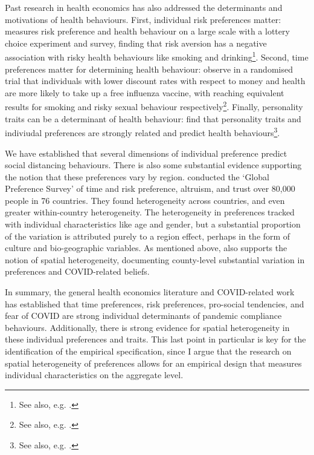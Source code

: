 \documentclass{article}
\begin{document}
Past research in health economics has also addressed the determinants and motivations of health behaviours. First, individual risk preferences matter: \textcite{andersonPredictingHealthBehaviors2008} measures risk preference and health behaviour on a large scale with a lottery choice experiment and survey, finding that risk aversion has a negative association with risky health behaviours like smoking and drinking\footnote{See also, e.g. \textcite{dohmenIndividualRiskAttitudes2011}.}. Second, time preferences matter for determining health behaviour: \textcite{chapmanTimePreferencesPreventive1999} observe in a randomised trial that individuals with lower discount rates with respect to money and health are more likely to take up a free influenza vaccine, with \textcite{harrisonIndividualDiscountRates2010,chessonDiscountRatesRisky2006} reaching equivalent results for smoking and risky sexual behaviour respectively\footnote{See also, e.g.  \textcite{dellavignaPayingNotGo2006,sutterImpatienceUncertaintyExperimental2013,stutzerLimitedSelfcontrolObesity2016,schilbachAlcoholSelfControlField2019}.}. Finally, personality traits can be a determinant of health behaviour: \textcite{rustichiniIntegrationPersonalityTheory2016} find that personality traits and indiviudal preferences are strongly related and predict health behaviours\footnote{See also, e.g. \textcite{booth-kewleyAssociationsMajorDomains1994,strickhouserDoesPersonalityPredict2017}.}.

We have established that several dimensions of individual preference predict social distancing behaviours. There is also some substantial evidence supporting the notion that these preferences vary by region. \textcite{falkGlobalEvidenceEconomic2018} conducted the `Global Preference Survey' of time and risk preference, altruism, and trust over 80,000 people in 76 countries. They found heterogeneity across countries, and even greater within-country heterogeneity. The heterogeneity in preferences tracked with individual characteristics like age and gender, but a substantial proportion of the variation is attributed purely to a region effect, perhaps in the form of culture and bio-geographic variables. As mentioned above, \textcite{fanHeterogeneousActionsBeliefs2020} also supports the notion of spatial heterogeneity, documenting county-level substantial variation in preferences and COVID-related beliefs.

In summary, the general health economics literature and COVID-related work has established that time preferences, risk preferences, pro-social tendencies, and fear of COVID are strong individual determinants of pandemic compliance behaviours. Additionally, there is strong evidence for spatial heterogeneity in these individual preferences and traits. This last point in particular is key for the identification of the empirical specification, since I argue that the research on spatial heterogeneity of preferences allows for an empirical design that measures individual characteristics on the aggregate level. 
\end{document}
